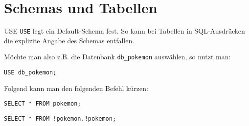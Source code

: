 \section{Schemas und Tabellen}

\begin{sql}{USE}
    \texttt{USE} legt ein Default-Schema fest.
    So kann bei Tabellen in SQL-Ausdrücken die explizite Angabe des Schemas entfallen.

    Möchte man also z.B. die Datenbank \texttt{db\_pokemon} auswählen, so nutzt man:

    \begin{lstlisting}[language=mysql]
        USE db_pokemon;
    \end{lstlisting}

    Folgend kann man den folgenden Befehl kürzen:

    \begin{lstlisting}[language=mysql]
        SELECT * FROM pokemon;
    \end{lstlisting}

    \begin{lstlisting}[language=mysql]
        SELECT * FROM !pokemon.!pokemon;
    \end{lstlisting}
\end{sql}

